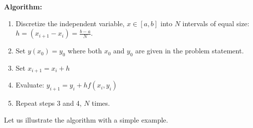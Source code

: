\noindent\textbf{Algorithm:}
\begin{enumerate}
\item Discretize the independent variable, $x \in [a,b]$ into $N$ intervals of equal size: $h = (x_{i+1}-x_i) = \frac{b-a}{N}$.
\item Set $y(x_0) = y_0$ where both $x_0$ and $y_0$ are given in the problem statement.
\item Set $x_{i+1} = x_i + h$
\item Evaluate: $y_{i+1} = y_i + hf(x_i,y_i)$
\item Repeat steps 3 and 4, $N$ times.
\end{enumerate}
Let us illustrate the algorithm with a simple example.

\vspace{0.25cm}

